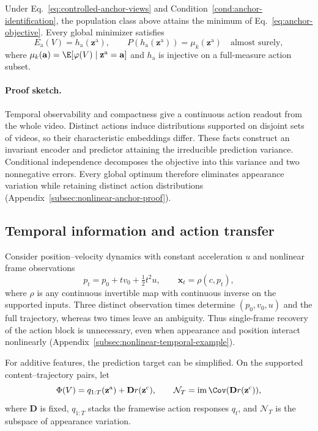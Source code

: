 \begin{theorem}
\label{thm:anchor-identification}
Under Eq.~\ref{eq:controlled-anchor-views} and
Condition~\ref{cond:anchor-identification}, the population class above
attains the minimum of Eq.~\ref{eq:anchor-objective}.
Every global minimizer satisfies
\begin{equation}
 E_{\mathrm a}(V)=h_{\mathrm a}(\mathbf z^{\mathrm a}),\qquad
 P(h_{\mathrm a}(\mathbf z^{\mathrm a}))=\mu_k(\mathbf z^{\mathrm a})
 \quad\text{almost surely},
 \label{eq:anchor-identification}
\end{equation}
where $\mu_k(\mathbf a)=\E[\varphi(V)\mid\mathbf z^{\mathrm a}=\mathbf a]$
and $h_{\mathrm a}$ is injective on a full-measure action subset.
\end{theorem}

\paragraph{Proof sketch.}
Temporal observability and compactness give a continuous action readout
from the whole video. Distinct actions induce distributions supported on
disjoint sets of videos, so their characteristic embeddings differ.
These facts construct an invariant encoder and predictor attaining the
irreducible prediction variance. Conditional independence decomposes the
objective into this variance and two nonnegative errors. Every global
optimum therefore eliminates appearance variation while retaining distinct
action distributions (Appendix~\ref{subsec:nonlinear-anchor-proof}).

\subsection{Temporal information and action transfer}
\label{subsec:anchor-realization}

Consider position--velocity dynamics with constant acceleration $u$ and
nonlinear frame observations
\[
 p_t=p_0+t v_0+\tfrac12t^2u,\qquad \mathbf x_t=\rho(c,p_t),
\]
where $\rho$ is any continuous invertible map with continuous inverse
on the supported inputs. Three distinct observation times determine
$(p_0,v_0,u)$ and the full trajectory, whereas two times leave an ambiguity.
Thus single-frame recovery of the action block is unnecessary, even when
appearance and position interact nonlinearly
(Appendix~\ref{subsec:nonlinear-temporal-example}).

For additive features, the prediction target can be simplified. On the
supported content--trajectory pairs, let
\[
 \Phi(V)=q_{1:T}(\mathbf z^{\mathrm a})+\mathbf D r(\mathbf z^{\mathrm c}),
 \qquad
 \mathcal N_T=\operatorname{im}\Cov(\mathbf D r(\mathbf z^{\mathrm c})),
\]
where $\mathbf D$ is fixed, $q_{1:T}$ stacks the framewise action responses
$q_t$, and $\mathcal N_T$ is the subspace of appearance variation.

